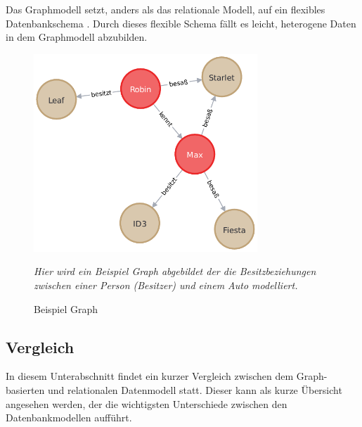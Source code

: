 Das Graphmodell setzt, anders als das relationale Modell, auf ein flexibles Datenbankschema \cite{gdbms}. Durch dieses flexible Schema fällt es leicht, heterogene Daten in dem Graphmodell abzubilden. 

\begin{figure}[ht]
    \centering
    \includegraphics[width=0.75\textwidth]{images/example_graph.pdf}
    \caption{Beispiel Graph}
    \vspace{1em}
    \textit{Hier wird ein Beispiel Graph abgebildet der die Besitzbeziehungen zwischen einer Person (Besitzer) und einem Auto modelliert.}
    \label{fig:beispiel_graph}
\end{figure}

\subsection{Vergleich}
In diesem Unterabschnitt findet ein kurzer Vergleich zwischen dem Graph-basierten und relationalen Datenmodell statt. Dieser kann als kurze Übersicht angesehen werden, der die wichtigsten Unterschiede zwischen den Datenbankmodellen aufführt. 

